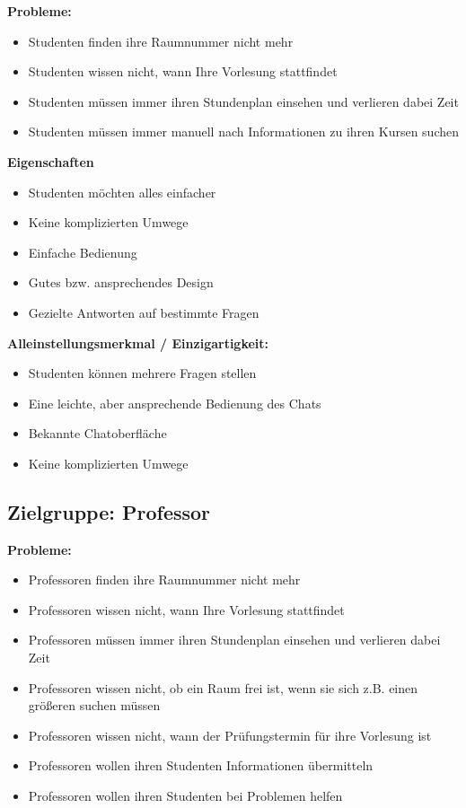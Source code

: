 \textbf{Probleme:}
\begin{itemize}
    \item Studenten finden ihre Raumnummer nicht mehr
    \item Studenten wissen nicht, wann Ihre Vorlesung stattfindet
    \item Studenten müssen immer ihren Stundenplan einsehen und verlieren dabei Zeit 
    \item Studenten müssen immer manuell nach Informationen zu ihren Kursen suchen
\end{itemize}
\medskip

\textbf{Eigenschaften}
\begin{itemize}
    \item Studenten möchten alles einfacher
    \item Keine komplizierten Umwege
    \item Einfache Bedienung
    \item Gutes bzw. ansprechendes Design
    \item Gezielte Antworten auf bestimmte Fragen
\end{itemize}
\medskip

\textbf{Alleinstellungsmerkmal / Einzigartigkeit:}
\begin{itemize}
    \item Studenten können mehrere Fragen stellen
    \item Eine leichte, aber ansprechende Bedienung des Chats
    \item Bekannte Chatoberfläche
    \item Keine komplizierten Umwege 
\end{itemize}

\newpage
\subsection{Zielgruppe: Professor}

\textbf{Probleme:}
\begin{itemize}
    \item Professoren finden ihre Raumnummer nicht mehr
    \item Professoren wissen nicht, wann Ihre Vorlesung stattfindet
    \item Professoren müssen immer ihren Stundenplan einsehen und verlieren dabei Zeit
    \item Professoren wissen nicht, ob ein Raum frei ist, wenn sie sich z.B. einen größeren suchen müssen
    \item Professoren wissen nicht, wann der Prüfungstermin für ihre Vorlesung ist
    \item Professoren wollen ihren Studenten Informationen übermitteln
    \item Professoren wollen ihren Studenten bei Problemen helfen
\end{itemize}
\medskip

